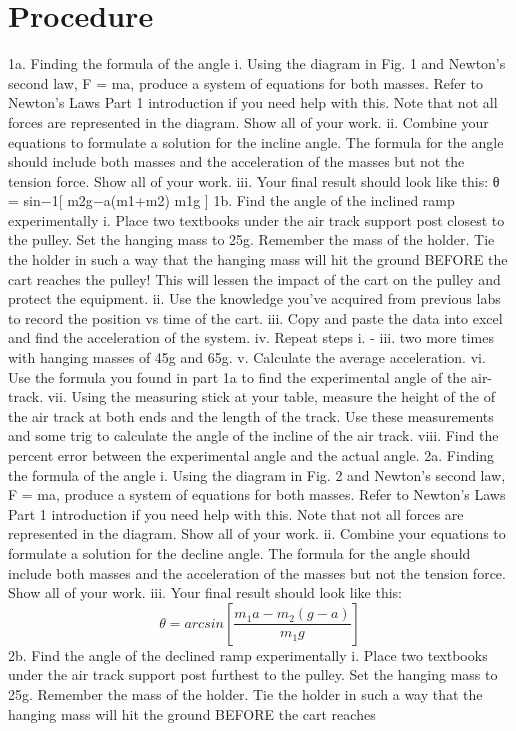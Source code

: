\documentclass[hidelinks, 12pt, letterpaper]{article}
\begin{document}
\section{Procedure}
1a. Finding the formula of the angle
i. Using the diagram in Fig. 1 and Newton’s second law, F = ma, produce a system
of equations for both masses. Refer to Newton’s Laws Part 1 introduction if you
need help with this. Note that not all forces are represented in the diagram. Show
all of your work.
ii. Combine your equations to formulate a solution for the incline angle. The formula
for the angle should include both masses and the acceleration of the masses but
not the tension force. Show all of your work.
iii. Your final result should look like this:
θ = sin−1[ m2g−a(m1+m2)
m1g ]
1b. Find the angle of the inclined ramp experimentally
i. Place two textbooks under the air track support post closest to the pulley. Set
the hanging mass to 25g. Remember the mass of the holder. Tie the holder in
such a way that the hanging mass will hit the ground BEFORE the cart reaches
the pulley! This will lessen the impact of the cart on the pulley and protect the
equipment.
ii. Use the knowledge you’ve acquired from previous labs to record the position vs
time of the cart.
iii. Copy and paste the data into excel and find the acceleration of the system.
iv. Repeat steps i. - iii. two more times with hanging masses of 45g and 65g.
v. Calculate the average acceleration.
vi. Use the formula you found in part 1a to find the experimental angle of the air-track.
vii. Using the measuring stick at your table, measure the height of the of the air track
at both ends and the length of the track. Use these measurements and some trig
to calculate the angle of the incline of the air track.
viii. Find the percent error between the experimental angle and the actual angle. 
2a. Finding the formula of the angle
i. Using the diagram in Fig. 2 and Newton’s second law, F = ma, produce a system
of equations for both masses. Refer to Newton’s Laws Part 1 introduction if you
need help with this. Note that not all forces are represented in the diagram. Show
all of your work.
ii. Combine your equations to formulate a solution for the decline angle. The formula
for the angle should include both masses and the acceleration of the masses but
not the tension force. Show all of your work.
iii. Your final result should look like this:
\begin{equation}
    \theta=arcsin\left[\frac{m_1a-m_2(g-a)}{m_1g}\right]
\end{equation}
2b. Find the angle of the declined ramp experimentally
i. Place two textbooks under the air track support post furthest to the pulley. Set
the hanging mass to 25g. Remember the mass of the holder. Tie the holder in
such a way that the hanging mass will hit the ground BEFORE the cart reaches
\end{document}
